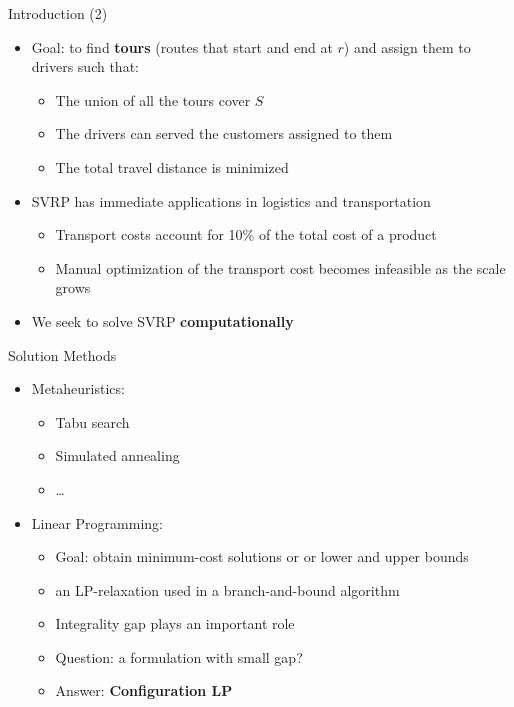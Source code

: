 \begin{frame}{Introduction (2)}
\begin{itemize}
    \item<1-> Goal: to find \textbf{tours} (routes that start and end at $r$) and assign them to drivers such that:
    \begin{itemize}
        \item<2-> The union of all the tours cover $S$
        \item<3-> The drivers can served the customers assigned to them
        \item<4-> The total travel distance is minimized
    \end{itemize}
    \item<5-> SVRP has immediate applications in logistics and transportation
        \begin{itemize}
            \item<6-> Transport costs account for 10\% of the total cost of a product
            \item<7-> Manual optimization of the transport cost becomes infeasible as the scale grows
        \end{itemize}
    \item<7-> We seek to solve SVRP \textbf{computationally}
\end{itemize}
\end{frame}


\begin{frame}[t]{Solution Methods}
    \begin{itemize}
        \item<1-> Metaheuristics:
            \begin{itemize}
                \item<2-> Tabu search
                \item<3-> Simulated annealing
                \item<4-> \ldots
            \end{itemize}
        \item<5-> Linear Programming:
            \begin{itemize}
                \item<6-> Goal: obtain minimum-cost solutions or or lower and upper bounds
                \item<7-> an LP-relaxation used in a branch-and-bound algorithm
                \item<8-> Integrality gap plays an important role
                \item<9-> Question: a formulation with small gap?
                \item<10-> Answer: \textbf{Configuration LP}
            \end{itemize}
    \end{itemize}
\end{frame}

